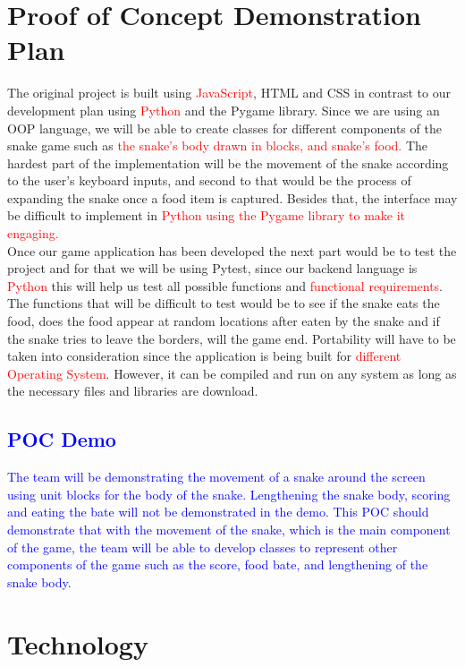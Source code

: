 \documentclass{article}
\begin{document}
\section{Proof of Concept Demonstration Plan}
The original project is built using \textcolor{red}{JavaScript}, HTML and CSS in contrast to our development plan using \textcolor{red}{Python} and the Pygame library. Since we are using an OOP language, we will be able to create classes for different components of the snake game such as \textcolor{red}{the snake's body drawn in blocks, and snake's food.} The hardest part of the implementation will be the movement of the snake according to the user's keyboard inputs, and second to that would be the process of expanding the snake once a food item is captured. Besides that, the interface may be difficult to implement in \textcolor{red}{Python using the Pygame library to make it engaging.}\\
	Once our game application has been developed the next part would be to test the project and for that we will be using Pytest, since our backend language is \textcolor{red}{Python} this will help us test all possible functions and \textcolor{red}{functional requirements}. The functions that will be difficult to test would be to see if the snake eats the food, does the food appear at random locations after eaten by the snake and if the snake tries to leave the borders, will the game end. Portability will have to be taken into consideration since the application is being built for \textcolor{red}{different Operating System}. However, it can be compiled and run on any system as long as the necessary files and libraries are download.


\textcolor{blue}{\subsection{POC Demo}
The team will be demonstrating the movement of a snake around the screen using unit blocks for the body of the snake. Lengthening the snake body, scoring and eating the bate will not be demonstrated in the demo. This POC should demonstrate that with the movement of the snake, which is the main component of the game, the team will be able to develop classes to represent other components of the game such as the score, food bate, and lengthening of the snake body.}

\section{Technology}
\end{document}
